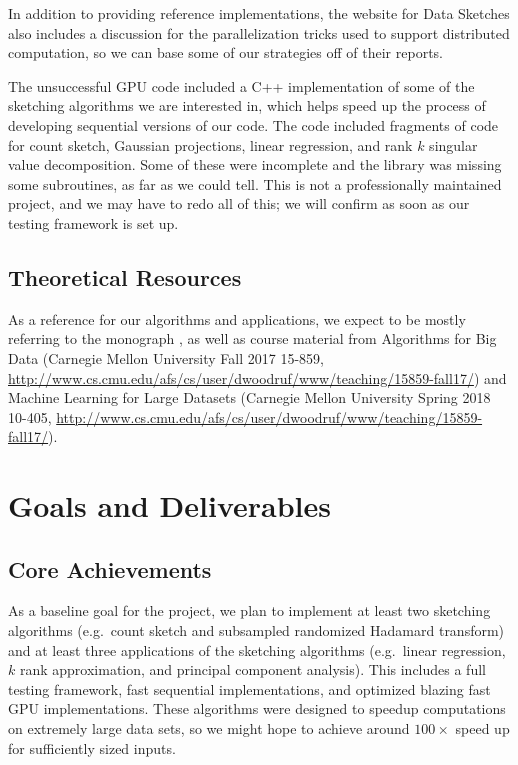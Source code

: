 \documentclass[12pt]{article}
\begin{document}
In addition to providing reference implementations, the website for Data Sketches also includes a discussion for the parallelization tricks used to support distributed computation, so we can base some of our strategies off of their reports. 

The unsuccessful GPU code included a C++ implementation of some of the sketching algorithms we are interested in, which helps speed up the process of developing sequential versions of our code. The code included fragments of code for count sketch, Gaussian projections, linear regression, and rank $k$ singular value decomposition. Some of these were incomplete and the library was missing some subroutines, as far as we could tell. This is not a professionally maintained project, and we may have to redo all of this; we will confirm as soon as our testing framework is set up. 

\subsection{Theoretical Resources}
As a reference for our algorithms and applications, we expect to be mostly referring to the monograph \cite{woodruff2014sketching}, as well as course material from Algorithms for Big Data (Carnegie Mellon University Fall 2017 15-859, \url{http://www.cs.cmu.edu/afs/cs/user/dwoodruf/www/teaching/15859-fall17/}) and Machine Learning for Large Datasets (Carnegie Mellon University Spring 2018 10-405, \url{http://www.cs.cmu.edu/afs/cs/user/dwoodruf/www/teaching/15859-fall17/}). 

\section{Goals and Deliverables}
\subsection{Core Achievements}
As a baseline goal for the project, we plan to implement at least two sketching algorithms (e.g.\ count sketch and subsampled randomized Hadamard transform) and at least three applications of the sketching algorithms (e.g.\ linear regression, $k$ rank approximation, and principal component analysis). This includes a full testing framework, fast sequential implementations, and optimized blazing fast GPU implementations. These algorithms were designed to speedup computations on extremely large data sets, so we might hope to achieve around $100\times$ speed up for sufficiently sized inputs. 
\end{document}
